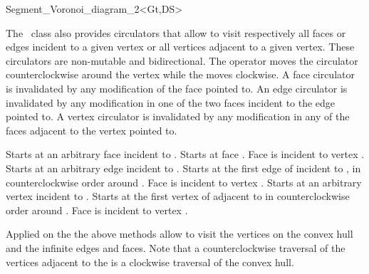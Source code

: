 \begin{ccRefClass}{Segment_Voronoi_diagram_2<Gt,DS>}

The \ccRefName\ class also provides circulators that allow to visit
respectively all faces or edges incident to a given vertex or all
vertices adjacent to a given vertex. These circulators are non-mutable
and bidirectional. The operator  moves the circulator
counterclockwise around the vertex while the  moves
clockwise. A face circulator is invalidated by any modification of the
face pointed to. An edge circulator is invalidated by any modification
in one of the two faces incident to the edge pointed to. A vertex
circulator is invalidated by any modification in any of the faces
adjacent to the vertex pointed to.

{Starts at an arbitrary face incident
to .}
\ccGlue
{}
{Starts at face .
\ccPrecond Face  is incident to vertex .}
\ccGlue
{}
{Starts at an arbitrary edge incident
to .}
\ccGlue
{}
{Starts at the first edge of  incident to 
, in counterclockwise order around .
\ccPrecond Face  is incident to vertex .}
\ccGlue
{}
{Starts at an arbitrary  vertex incident
to .}
\ccGlue
{}
{Starts at the first vertex of  adjacent  to 
in  counterclockwise order around .
\ccPrecond Face  is incident to vertex .}




Applied on the 
the above methods  allow to visit the vertices on the convex hull and
the infinite edges and faces. Note that a counterclockwise
traversal of the vertices adjacent to the  is
a clockwise traversal of the convex hull.

\ccGlue
{}
\ccGlue
{}
\ccGlue
{}
\ccGlue
{}
\ccGlue
{}





\end{ccRefClass}
